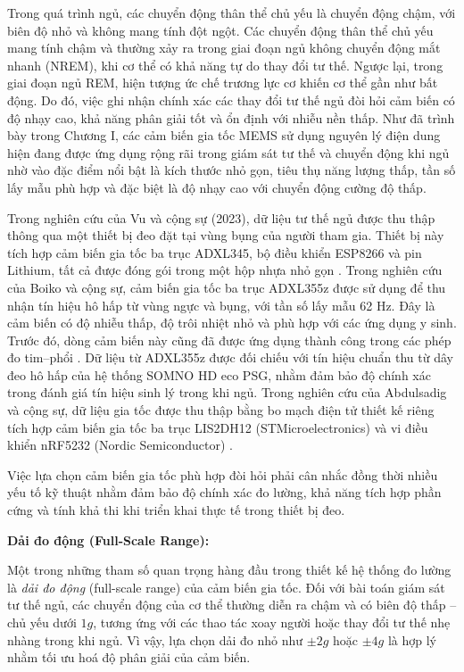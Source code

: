 Trong quá trình ngủ, các chuyển động thân thể chủ yếu là chuyển động 
chậm, với biên độ nhỏ và không mang tính đột ngột. 
Các chuyển động thân thể chủ yếu mang tính chậm và thường xảy ra 
trong giai đoạn ngủ không chuyển động mắt nhanh (NREM), 
khi cơ thể có khả năng tự do thay đổi tư thế. Ngược lại, 
trong giai đoạn ngủ REM, hiện tượng ức chế trương lực cơ khiến 
cơ thể gần như bất động.
Do đó, việc ghi 
nhận chính xác các thay đổi tư thế ngủ đòi hỏi cảm biến có độ nhạy cao, 
khả năng phân giải tốt và ổn định với nhiễu nền thấp. Như đã trình bày 
trong Chương I, các cảm biến gia tốc MEMS sử dụng nguyên lý điện dung 
hiện đang được ứng dụng rộng rãi trong giám sát tư thế và chuyển động 
khi ngủ nhờ vào đặc điểm nổi bật là kích thước nhỏ gọn, tiêu thụ năng 
lượng thấp, tần số lấy mẫu phù hợp và đặc biệt là độ nhạy cao với 
chuyển động cường độ thấp.

Trong nghiên cứu của Vu và cộng sự (2023), dữ liệu tư thế ngủ được thu 
thập thông qua một thiết bị đeo đặt tại vùng bụng của người tham gia. 
Thiết bị này tích hợp cảm biến gia tốc ba trục ADXL345, 
bộ điều khiển ESP8266 và pin Lithium, tất cả được đóng gói trong 
một hộp nhựa nhỏ gọn \cite{vu2023}. Trong nghiên cứu của Boiko 
và cộng sự, cảm biến gia tốc ba trục ADXL355z 
được sử dụng để thu nhận tín hiệu hô hấp từ vùng ngực và bụng, 
với tần số lấy mẫu 62 Hz. Đây là cảm biến có độ nhiễu thấp, 
độ trôi nhiệt nhỏ và phù hợp với các ứng dụng y sinh. Trước đó, 
dòng cảm biến này cũng đã được ứng dụng thành công trong các phép 
đo tim–phổi \cite{Boiko2023}. Dữ liệu từ ADXL355z được đối chiếu với tín hiệu chuẩn 
thu từ dây đeo hô hấp của hệ thống SOMNO HD eco PSG, nhằm đảm bảo 
độ chính xác trong đánh giá tín hiệu sinh lý trong khi ngủ.
Trong nghiên cứu của Abdulsadig và cộng sự, dữ liệu gia tốc được 
thu thập bằng bo mạch điện tử thiết kế riêng tích hợp cảm biến gia tốc 
ba trục LIS2DH12 (STMicroelectronics) và vi điều khiển nRF5232 
(Nordic Semiconductor) \cite{Sleep_Posture_Detection}.



Việc lựa chọn cảm biến gia tốc phù hợp đòi hỏi phải cân nhắc 
đồng thời nhiều yếu tố kỹ thuật nhằm đảm bảo độ chính xác đo lường, 
khả năng tích hợp phần cứng và tính khả thi khi triển khai thực 
tế trong thiết bị đeo. 

\textbf{Dải đo động (Full-Scale Range):}

Một trong những tham số quan trọng hàng đầu trong thiết kế hệ 
thống đo lường là \textit{dải đo động} (full-scale range) 
của cảm biến gia tốc. Đối với bài toán giám sát tư thế ngủ, 
các chuyển động của cơ thể thường diễn ra chậm và có biên độ 
thấp – chủ yếu dưới $1g$, tương ứng với các thao tác xoay người 
hoặc thay đổi tư thế nhẹ nhàng trong khi ngủ. 
Vì vậy, lựa chọn dải đo nhỏ như $\pm2g$ hoặc $\pm4g$ là hợp 
lý nhằm tối ưu hoá độ phân giải của cảm biến.

